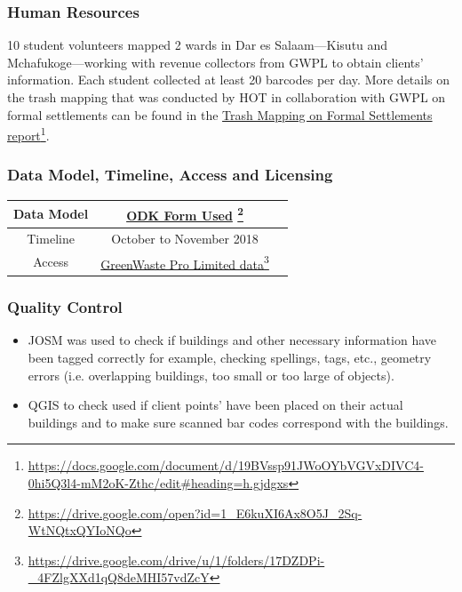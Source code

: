 \documentclass[a4paper,12pt,twoside]{article}
\begin{document}
\subsubsection{Human Resources}
10 student volunteers mapped 2 wards in Dar es Salaam---Kisutu and Mchafukoge---working with revenue collectors from GWPL to obtain clients’ information. Each student collected at least 20 barcodes per day. More details on the trash mapping that was conducted by HOT in collaboration with GWPL on formal settlements can be found in the \href{https://docs.google.com/document/d/19BVssp91JWoOYbVGVxDIVC4-0hi5Q3l4-mM2oK-Zthc/edit#heading=h.gjdgxs}{Trash Mapping on Formal Settlements report}\footnote{\url{https://docs.google.com/document/d/19BVssp91JWoOYbVGVxDIVC4-0hi5Q3l4-mM2oK-Zthc/edit#heading=h.gjdgxs}}.

\subsubsection{Data Model, Timeline, Access and Licensing}
\begin{center}
\begin{tabular}{|c|c|c|}  
 \hline
Data Model &
       \href{https://drive.google.com/open?id=1_E6kuXI6Ax8O5J_2Sq-WtNQtxQYIoNQo}{ODK Form Used} \footnote{\url{https://drive.google.com/open?id=1_E6kuXI6Ax8O5J_2Sq-WtNQtxQYIoNQo}} \\
 \hline
  Timeline  &  October to November 2018 \\
\hline  
 Access  & 
    \href{https://drive.google.com/drive/u/1/folders/17DZDPi-_4FZlgXXd1qQ8deMHI57vdZcY}{GreenWaste Pro Limited data}\footnote{\url{https://drive.google.com/drive/u/1/folders/17DZDPi-_4FZlgXXd1qQ8deMHI57vdZcY}} \\
\hline
\end{tabular}
\end{center}

\subsubsection{Quality Control}
\begin{itemize}
    \item JOSM was used to check if buildings and other necessary information have been tagged correctly for example, checking spellings, tags, etc., geometry errors (i.e. overlapping buildings, too small or too large of objects). 
     \item QGIS to check used if client points' have been placed on their actual buildings and to make sure scanned bar codes correspond with the buildings.
\end{itemize}
\end{document}
